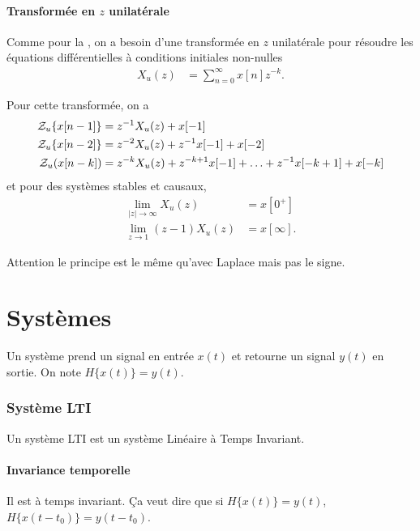 \subsection{Transformée en $z$ unilatérale}
Comme pour la , on a besoin
d'une transformée en $z$ unilatérale pour résoudre les équations
différentielles à conditions initiales non-nulles
\begin{align*}
  X_u(z) & = \sum_{n=0}^\infty x[n] z^{-k}.
\end{align*}

Pour cette transformée, on a
\begin{align*}
  \mathcal{Z}_u\{x[n-1]\} & =
  z^{-1}X_u(z) + x[-1]\\
  \mathcal{Z}_u\{x[n-2]\} & =
  z^{-2}X_u(z) + z^{-1}x[-1] + x[-2]\\
  \mathcal{Z}_u(x[n-k]) & =
  z^{-k}X_u(z) + z^{-k+1}x[-1] + \ldots + z^{-1}x[-k+1] + x[-k]
\end{align*}
et pour des systèmes stables et causaux,
\begin{align*}
  \lim_{|z|\to\infty} X_u(z) & = x[0^+]\\
  \lim_{z\to 1} (z-1)X_u(z) & = x[\infty].
\end{align*}

Attention le principe est le même qu'avec Laplace mais pas le signe.




\part{Systèmes}
Un système prend un signal en entrée $x(t)$ et retourne un signal $y(t)$
en sortie.
On note $H\{x(t)\} = y(t)$.

\section{Système LTI}
Un système LTI est un système Linéaire à Temps Invariant.

\subsection{Invariance temporelle}
Il est à temps invariant.
Ça veut dire que si $H\{x(t)\} = y(t)$, $H\{x(t-t_0)\} = y(t-t_0)$.

